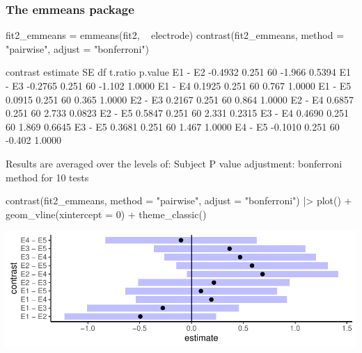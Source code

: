 \documentclass[a4paper]{article}
\begin{document}
\subsubsection{The emmeans package}
\begin{Schunk}
\begin{Sinput}
fit2_emmeans = emmeans(fit2, ~ electrode)
contrast(fit2_emmeans, method = "pairwise", adjust = "bonferroni")
\end{Sinput}
\begin{Soutput}
 contrast estimate    SE df t.ratio p.value
 E1 - E2   -0.4932 0.251 60  -1.966  0.5394
 E1 - E3   -0.2765 0.251 60  -1.102  1.0000
 E1 - E4    0.1925 0.251 60   0.767  1.0000
 E1 - E5    0.0915 0.251 60   0.365  1.0000
 E2 - E3    0.2167 0.251 60   0.864  1.0000
 E2 - E4    0.6857 0.251 60   2.733  0.0823
 E2 - E5    0.5847 0.251 60   2.331  0.2315
 E3 - E4    0.4690 0.251 60   1.869  0.6645
 E3 - E5    0.3681 0.251 60   1.467  1.0000
 E4 - E5   -0.1010 0.251 60  -0.402  1.0000

Results are averaged over the levels of: Subject 
P value adjustment: bonferroni method for 10 tests 
\end{Soutput}
\begin{Sinput}
contrast(fit2_emmeans, method = "pairwise", adjust = "bonferroni") |> 
  plot() + geom_vline(xintercept = 0) +
  theme_classic()
\end{Sinput}


{\centering \includegraphics[width=\maxwidth]{figure/listings-unnamed-chunk-293-1} 

}

\end{Schunk}
\end{document}
